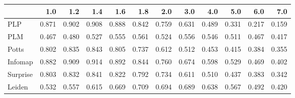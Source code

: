 \begin{tabular}{lrrrrrrrrrrr}
\toprule
{} &   1.0 &   1.2 &   1.4 &   1.6 &   1.8 &   2.0 &   3.0 &   4.0 &   5.0 &   6.0 &   7.0 \\
\midrule
PLP      & 0.871 & 0.902 & 0.908 & 0.888 & 0.842 & 0.759 & 0.631 & 0.489 & 0.331 & 0.217 & 0.159 \\
PLM      & 0.467 & 0.480 & 0.527 & 0.555 & 0.561 & 0.524 & 0.556 & 0.546 & 0.511 & 0.467 & 0.417 \\
Potts    & 0.802 & 0.835 & 0.843 & 0.805 & 0.737 & 0.612 & 0.512 & 0.453 & 0.415 & 0.384 & 0.355 \\
Infomap  & 0.882 & 0.909 & 0.914 & 0.892 & 0.844 & 0.760 & 0.674 & 0.598 & 0.529 & 0.469 & 0.402 \\
Surprise & 0.803 & 0.832 & 0.841 & 0.822 & 0.792 & 0.734 & 0.611 & 0.510 & 0.437 & 0.383 & 0.342 \\
Leiden   & 0.532 & 0.557 & 0.615 & 0.669 & 0.709 & 0.694 & 0.689 & 0.638 & 0.567 & 0.492 & 0.420 \\
\bottomrule
\end{tabular}
